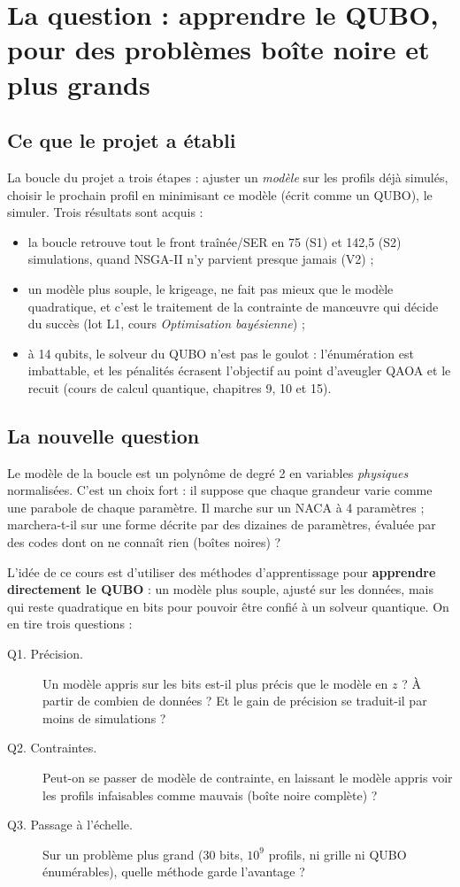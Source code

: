 \chapter{La question : apprendre le QUBO, pour des problèmes boîte noire et plus grands}\label{ch:question}

\section{Ce que le projet a établi}
La boucle du projet a trois étapes : ajuster un \emph{modèle} sur les profils déjà simulés, choisir le prochain profil en minimisant ce modèle (écrit comme un QUBO), le simuler. Trois résultats sont acquis :
\begin{itemize}
\item la boucle retrouve tout le front traînée/SER en 75 (S1) et 142,5 (S2) simulations, quand NSGA-II n'y parvient presque jamais (V2) ;
\item un modèle plus souple, le krigeage, ne fait pas mieux que le modèle quadratique, et c'est le traitement de la contrainte de manœuvre qui décide du succès (lot L1, cours \emph{Optimisation bayésienne}) ;
\item à 14 qubits, le solveur du QUBO n'est pas le goulot : l'énumération est imbattable, et les pénalités écrasent l'objectif au point d'aveugler QAOA et le recuit (cours de calcul quantique, chapitres 9, 10 et 15).
\end{itemize}

\section{La nouvelle question}
Le modèle de la boucle est un polynôme de degré 2 en variables \emph{physiques} normalisées. C'est un choix fort : il suppose que chaque grandeur varie comme une parabole de chaque paramètre. Il marche sur un NACA à 4 paramètres ; marchera-t-il sur une forme décrite par des dizaines de paramètres, évaluée par des codes dont on ne connaît rien (boîtes noires) ?

L'idée de ce cours est d'utiliser des méthodes d'apprentissage pour \textbf{apprendre directement le QUBO} : un modèle plus souple, ajusté sur les données, mais qui reste quadratique en bits pour pouvoir être confié à un solveur quantique. On en tire trois questions :
\begin{description}
\item[Q1. Précision.] Un modèle appris sur les bits est-il plus précis que le modèle en $z$ ? À partir de combien de données ? Et le gain de précision se traduit-il par moins de simulations ?
\item[Q2. Contraintes.] Peut-on se passer de modèle de contrainte, en laissant le modèle appris \og voir\fg{} les profils infaisables comme mauvais (boîte noire complète) ?
\item[Q3. Passage à l'échelle.] Sur un problème plus grand (30 bits, $10^9$ profils, ni grille ni QUBO énumérables), quelle méthode garde l'avantage ?
\end{description}

